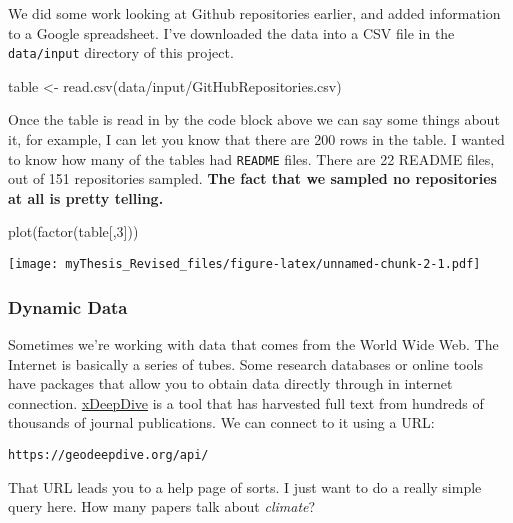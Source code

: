\documentclass[
]{article}
\newenvironment{Shaded}{\begin{snugshade}}{\end{snugshade}}
\newcommand{\DecValTok}[1]{\textcolor[rgb]{0.00,0.00,0.81}{#1}}
\newcommand{\FunctionTok}[1]{\textcolor[rgb]{0.00,0.00,0.00}{#1}}
\newcommand{\NormalTok}[1]{#1}
\newcommand{\OtherTok}[1]{\textcolor[rgb]{0.56,0.35,0.01}{#1}}
\newcommand{\StringTok}[1]{\textcolor[rgb]{0.31,0.60,0.02}{#1}}
\begin{document}
We did some work looking at Github repositories earlier, and added
information to a Google spreadsheet. I've downloaded the data into a CSV
file in the \texttt{data/input} directory of this project.

\begin{Shaded}
\begin{Highlighting}[]
\NormalTok{table }\OtherTok{\textless{}{-}} \FunctionTok{read.csv}\NormalTok{(}\StringTok{\textquotesingle{}data/input/GitHubRepositories.csv\textquotesingle{}}\NormalTok{)}
\end{Highlighting}
\end{Shaded}

Once the table is read in by the code block above we can say some things
about it, for example, I can let you know that there are 200 rows in the
table. I wanted to know how many of the tables had \texttt{README}
files. There are 22 README files, out of 151 repositories sampled.
\textbf{The fact that we sampled no repositories at all is pretty
telling.}

\begin{Shaded}
\begin{Highlighting}[]
\FunctionTok{plot}\NormalTok{(}\FunctionTok{factor}\NormalTok{(table[,}\DecValTok{3}\NormalTok{]))}
\end{Highlighting}
\end{Shaded}

\texttt{[image: myThesis\_Revised\_files/figure-latex/unnamed-chunk-2-1.pdf]}

\hypertarget{dynamic-data}{%
\subsubsection{Dynamic Data}\label{dynamic-data}}

Sometimes we're working with data that comes from the World Wide Web.
The Internet is basically a series of tubes. Some research databases or
online tools have packages that allow you to obtain data directly
through in internet connection. \href{http://geodeepdive.org}{xDeepDive}
is a tool that has harvested full text from hundreds of thousands of
journal publications. We can connect to it using a URL:

\begin{verbatim}
https://geodeepdive.org/api/
\end{verbatim}

That URL leads you to a help page of sorts. I just want to do a really
simple query here. How many papers talk about \emph{climate}?
\end{document}
